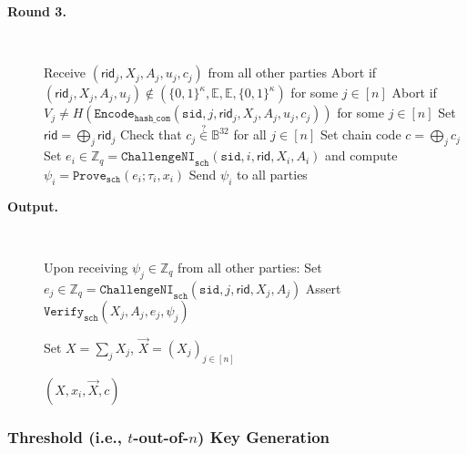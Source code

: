 \documentclass[11pt]{article}
\newcommand{\sid}{\ensuremath{\mathtt{sid}}}
\newcommand{\var}[1]{\ensuremath{\mathtt{#1}}}
\newcommand{\challengeni}[1]{\ensuremath{\mathtt{ChallengeNI}_{\mathtt{#1}}}}
\newcommand{\prove}[1]{\ensuremath{\mathtt{Prove}_{\mathtt{#1}}}}
\newcommand{\verify}[1]{\ensuremath{\mathtt{Verify}_{\mathtt{#1}}}}
\newcommand{\Encode}[1][]{\ensuremath{\mathtt{Encode}_{\mathtt{#1}}}}
\newcommand{\rid}{\textsf{rid}}
\newcommand{\E}{\mathbb{E}}
\newcommand{\Z}{\mathbb{Z}}
\newcommand{\?}[1]{\stackrel{?}{#1}}
\newcommand{\Bit}{\ensuremath{\{0{,}1\}}}
\newcommand{\Byte}{\ensuremath{\mathbb{B}}}
\begin{document}
\begin{description}
    \item[\bf Round 3.] \
    \begin{algorithmic}[1]
        \State Receive $(\rid_j, X_j, A_j, u_j, c_j)$ from all other parties
        \State Abort if $(\rid_j, X_j, A_j, u_j) \notin (\Bit^\kappa, \E, \E, \Bit^\kappa)$
               for some $j \in [n]$
        \State Abort if $V_j \neq H(\Encode[hash\_com](\sid, j, \rid_j, X_j, A_j, u_j, c_j))$
               for some $j \in [n]$
        \State Set $\rid = \bigoplus_j \rid_j$
        \If{$\var{hd\_wallets}$}
            \State Check that $c_j \? \in \Byte^{32}$ for all $j \in [n]$
            \State Set chain code $c = \bigoplus_j c_j$
        \EndIf
        \State Set $e_i \in \Z_q = \challengeni{sch}(\sid, i, \rid, X_i, A_i)$
               and compute $\psi_i = \prove{sch}(e_i; \tau_i, x_i)$
        \State Send $\psi_i$ to all parties
    \end{algorithmic}

    \item[\bf Output.] \
    \begin{algorithmic}[1]
        \State Upon receiving $\psi_j \in \Z_q$ from all other parties:
            \State Set $e_j \in \Z_q = \challengeni{sch}(\sid, j, \rid, X_j, A_j)$
            \State Assert $\verify{sch}(X_j, A_j, e_j, \psi_j)$
        \EndFor

        \State Set $X = \sum_j X_j$,
               $\vec X = (X_j)_{j\in[n]}$

        \State \Return $(X, x_i, \vec X, c)$
    \end{algorithmic}

\end{description}

\subsubsection{Threshold (i.e., $t$-out-of-$n$) Key Generation}
\label{sec:t-of-n-dkg}
\end{document}
